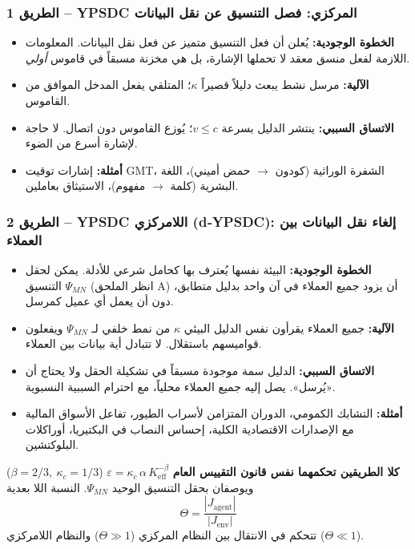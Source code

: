 \documentclass[12pt,a4paper]{article}
\begin{document}
	\subsubsection*{الطريق 1 – YPSDC المركزي: فصل التنسيق عن نقل البيانات}
	\begin{itemize}[leftmargin=*]
		\item \textbf{الخطوة الوجودية:} يُعلن أن فعل التنسيق متميز عن فعل نقل البيانات. المعلومات اللازمة لفعل منسق معقد لا تحملها الإشارة، بل هي مخزنة مسبقاً في قاموس \emph{أولي}.
		\item \textbf{الآلية:} مرسل نشط يبعث دليلاً قصيراً \(\kappa\)؛ المتلقي يفعل المدخل الموافق من القاموس.
		\item \textbf{الاتساق السببي:} ينتشر الدليل بسرعة \(v \le c\)؛ يُوزع القاموس دون اتصال. لا حاجة لإشارة أسرع من الضوء.
		\item \textbf{أمثلة:} إشارات توقيت GMT، الشفرة الوراثية (كودون \(\to\) حمض أميني)، اللغة البشرية (كلمة \(\to\) مفهوم)، الاستيثاق بعاملين.
	\end{itemize}
	
	\subsubsection*{الطريق 2 – YPSDC اللامركزي (d‑YPSDC): إلغاء نقل البيانات بين العملاء}
	\begin{itemize}[leftmargin=*]
		\item \textbf{الخطوة الوجودية:} البيئة نفسها يُعترف بها كحامل شرعي للأدلة. يمكن لحقل التنسيق \(\Psi_{MN}\) (انظر الملحق A) أن يزود جميع العملاء في آن واحد بدليل متطابق، دون أن يعمل أي عميل كمرسل.
		\item \textbf{الآلية:} جميع العملاء يقرأون نفس الدليل البيئي \(\kappa\) من نمط خلفي لـ \(\Psi_{MN}\) ويفعلون قواميسهم باستقلال. لا تتبادل أية بيانات بين العملاء.
		\item \textbf{الاتساق السببي:} الدليل سمة موجودة مسبقاً في تشكيلة الحقل ولا يحتاج أن «يُرسل». يصل إليه جميع العملاء محلياً، مع احترام السببية النسبوية.
		\item \textbf{أمثلة:} التشابك الكمومي، الدوران المتزامن لأسراب الطيور، تفاعل الأسواق المالية مع الإصدارات الاقتصادية الكلية، إحساس النصاب في البكتيريا، أوراكلات البلوكتشين.
	\end{itemize}
	
	\medskip
	\noindent
	\textbf{كلا الطريقين تحكمهما نفس قانون التقييس العام} \(\varepsilon = \kappa_c\,\alpha\,K_{\mathrm{eff}}^{-\beta}\) (\(\beta = 2/3,\ \kappa_c = 1/3\)) ويوصفان بحقل التنسيق الوحيد \(\Psi_{MN}\). النسبة اللا بعدية
	\[
	\Theta = \frac{|J_{\mathrm{agent}}|}{|J_{\mathrm{env}}|}
	\]
	تتحكم في الانتقال بين النظام المركزي (\(\Theta \gg 1\)) والنظام اللامركزي (\(\Theta \ll 1\)).
	
\end{document}
